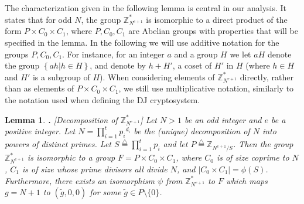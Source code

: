 \documentclass[11pt]{article}
\def\eqdef{\stackrel {\triangle}{=}}
\newcommand{\order}{{\mathrm{ord}}}
\newcommand{\encdj}{{E}_{N,e}}
\newcommand{\set}[1]{\left\{#1\right\}}
\newcommand{\size}[1]{|#1|}
\newcommand{\condset}[2]{\set{#1|#2}}
\newcommand{\Z}{{\mathbb{Z}}}
\newtheorem{LEMMA}{Lemma}[section]
\newenvironment{lemma}{\begin{LEMMA} \hspace{-.85em} {\bf .} \rm}%
	{\end{LEMMA}}
\newcommand{\U}[1]{\mathbb{Z}_{#1}^*}
\begin{document}
The characterization given in the following lemma is central in our
analysis. It states that for odd $N$, the group $\U{N^{e+1}}$ is
isomorphic to a direct product of the form $P\times C_0\times C_1$,
where $P,C_0,C_1$ are Abelian groups with properties that will be
specified in the lemma. In the following we will use additive
notation for the groups $P,C_0,C_1$. For instance, for an integer $a$
and a group $H$ we let $aH$ denote the group $\condset{ah}{h\in H}$,
and denote by $h+H'$, a coset of $H'$ in $H$ (where $h\in H$ and $H'$
is a subgroup of $H$). When considering elements of $\U{N^{e+1}}$
directly, rather than as elements of $P\times C_0\times C_1$, we
still use multiplicative notation, similarly to the notation used
when defining the DJ cryptosystem.
\begin{lemma}[Decomposition of $\U{N^{e+1}}$]
\label{lem-g-structure} Let $N>1$ be an odd integer and $e$ be a
positive integer.  Let $N=\prod_{i=1}^t{p_i}^{d_i}$ be the (unique)
decomposition of $N$ into powers of distinct primes. Let
$S\eqdef\prod^t_{i=1}p_i$ and let $P\eqdef\Z_{N^{e+1}/S}$. Then the
group $\U{N^{e+1}}$ is isomorphic to a group $F= P\times C_0\times
C_1$, where $C_0$ is of size coprime to $N$, $C_1$ is of size whose
prime divisors all divide $N$, and $\size{C_0\times C_1}=\phi(S)$.
Furthermore, there exists an isomorphism $\psi$ from $\U{N^{e+1}}$ to $F$
which maps $g=N+1$ to $(\tilde{g},0,0)$ for some $\tilde{g}\in
P\setminus\{0\}$.
\end{lemma}

%
\end{document}
